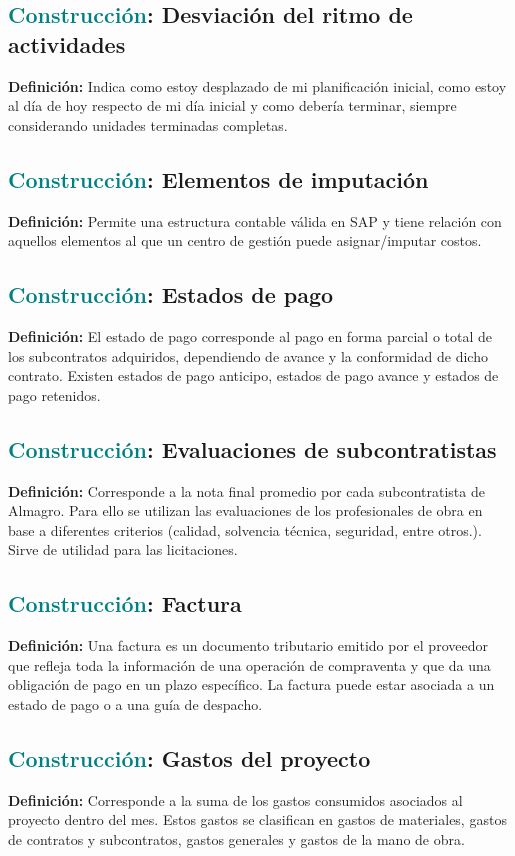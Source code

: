\documentclass[12pt]{article}
\begin{document}
\subsection{\textcolor{teal}{Construcción}: Desviación del ritmo de actividades}
\textbf{Definición:} Indica como estoy desplazado de mi planificación inicial, como estoy al día de hoy respecto de mi día inicial y como debería terminar, siempre considerando unidades terminadas completas.
\subsection{\textcolor{teal}{Construcción}: Elementos de imputación}
\textbf{Definición:} Permite una estructura contable válida en SAP y tiene relación con aquellos elementos al que un centro de gestión puede asignar/imputar costos.
\subsection{\textcolor{teal}{Construcción}: Estados de pago}
\textbf{Definición:} El estado de pago corresponde al pago en forma parcial o total de los subcontratos adquiridos, dependiendo de avance y la conformidad de dicho contrato. Existen estados de pago anticipo, estados de pago avance y estados de pago retenidos.
\subsection{\textcolor{teal}{Construcción}: Evaluaciones de subcontratistas}
\textbf{Definición:} Corresponde a la nota final promedio por cada subcontratista de Almagro. Para ello se utilizan las evaluaciones de los profesionales de obra en base a diferentes criterios (calidad, solvencia técnica, seguridad, entre otros.). Sirve de utilidad para las licitaciones.
\subsection{\textcolor{teal}{Construcción}: Factura}
\textbf{Definición:} Una factura es un documento tributario emitido por el proveedor que refleja toda la información de una operación de compraventa y que da una obligación de pago en un plazo específico. La factura puede estar asociada a un estado de pago o a una guía de despacho.
\subsection{\textcolor{teal}{Construcción}: Gastos del proyecto}
\textbf{Definición:} Corresponde a la suma de los gastos consumidos asociados al proyecto dentro del mes. Estos gastos se clasifican en gastos de materiales, gastos de contratos y subcontratos, gastos generales y gastos de la mano de obra.
\end{document}
